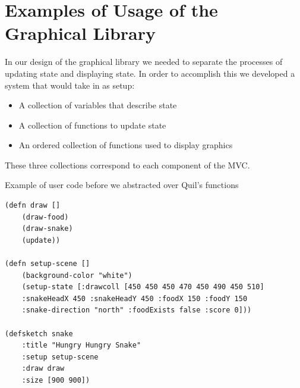 \documentclass[12pt]{article}
\newcommand{\comment}[1]{{\bf \tt  {#1}}}
\newcommand{\todo}[1]{\textcolor{blue}{\comment{To Do: {#1}}}}
\newcommand{\pscomment}[1]{\textcolor{red}{\comment{Paul: {#1}}}}
\begin{document}
%


\section{Examples of Usage of the Graphical Library}\label{sec:usage}

In our design of the graphical library we needed to separate the processes of updating state and displaying state. In order to accomplish this we developed a system that would take in as setup:
\begin{itemize}
	\item A collection of variables that describe state
	\item A collection of functions to update state
	\item An ordered collection of functions used to display graphics
\end{itemize}
These three collections correspond to each component of the MVC.

Example of user code before we abstracted over Quil's functions
\begin{verbatim}
(defn draw []
	(draw-food)
	(draw-snake)
	(update))

(defn setup-scene []
	(background-color "white")
	(setup-state [:drawcoll [450 450 450 470 450 490 450 510] 
	:snakeHeadX 450 :snakeHeadY 450 :foodX 150 :foodY 150 
	:snake-direction "north" :foodExists false :score 0]))

(defsketch snake 
	:title "Hungry Hungry Snake"
	:setup setup-scene
	:draw draw 
	:size [900 900])
\end{verbatim}
\end{document}
